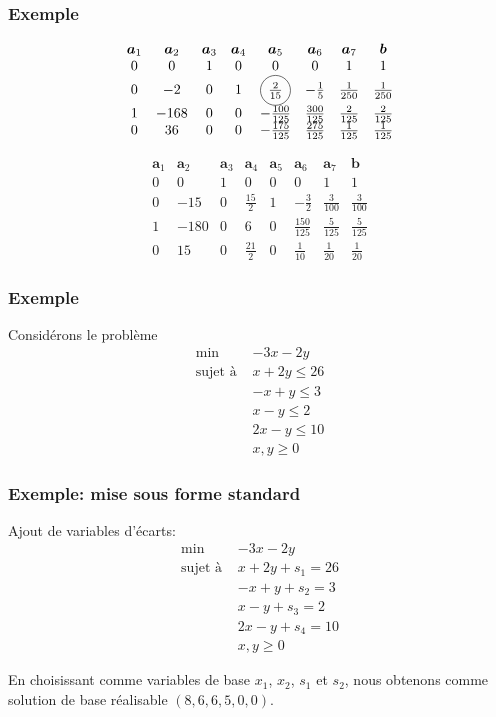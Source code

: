 \documentclass[t,usepdftitle=false]{beamer}
\newcommand*\circled[1]{\tikz[baseline=(char.base)]{
    \node[shape=circle,draw,inner sep=2pt] (char) {#1};}}
\def\ba{\boldsymbol{a}}
\def\bb{\boldsymbol{b}}
\begin{document}
\begin{frame}
	\frametitle{Exemple}
	
	\[
	\begin{matrix}
		\ba_1 & \ba_2 & \ba_3 & \ba_4 & \ba_5 &\ba_6 &\ba_7 & \bb \\
		0 & 0 & 1 & 0 & 0 & 0 & 1 & 1 \\
		0 & -2 & 0 & 1 & \circled{$\frac{2}{15}$} & -\frac{1}{5} & \frac{1}{250} & \frac{1}{250} \\
		1 & -168 & 0 & 0 & -\frac{100}{125} & \frac{300}{125} & \frac{2}{125} & \frac{2}{125} \\
		0 & 36 & 0 & 0 & -\frac{175}{125} & \frac{275}{125} & \frac{1}{125} & \frac{1}{125}
	\end{matrix}
	\]
	
	\[
	\begin{matrix}
		\ba_1 & \ba_2 & \ba_3 & \ba_4 & \ba_5 &\ba_6 &\ba_7 & \bb \\
		0 & 0 & 1 & 0 & 0 & 0 & 1 & 1 \\
		0 & -15 & 0 & \frac{15}{2} & 1 & -\frac{3}{2} & \frac{3}{100} & \frac{3}{100} \\
		1 & -180 & 0 & 6 & 0 & \frac{150}{125} & \frac{5}{125} & \frac{5}{125} \\
		0 & 15 & 0 & \frac{21}{2} & 0 & \frac{1}{10} & \frac{1}{20} & \frac{1}{20}
	\end{matrix}
	\]
	
\end{frame}

\begin{frame}
	\frametitle{Exemple}
	
	Considérons le problème
	\begin{align*}
		\min\ & -3x -2y \\
		\text{sujet à } & x + 2y \leq 26 \\
		& -x + y \leq 3 \\
		& x - y \leq 2 \\
		& 2x - y \leq 10 \\
		& x, y \geq 0
	\end{align*}
	
\end{frame}

\begin{frame}
	\frametitle{Exemple: mise sous forme standard}
	
	Ajout de variables d'écarts:
	\begin{align*}
		\min\ & -3x -2y \\
		\text{sujet à } & x + 2y + s_1 = 26 \\
		& -x + y + s_2 = 3 \\
		& x - y + s_3 = 2 \\
		& 2x - y + s_4 = 10 \\
		& x, y \geq 0
	\end{align*}
	
	En choisissant comme variables de base $x_1$, $x_2$, $s_1$ et $s_2$, nous obtenons comme solution de base réalisable $(8, 6, 6, 5, 0, 0)$.
	
\end{frame}
\end{document}
